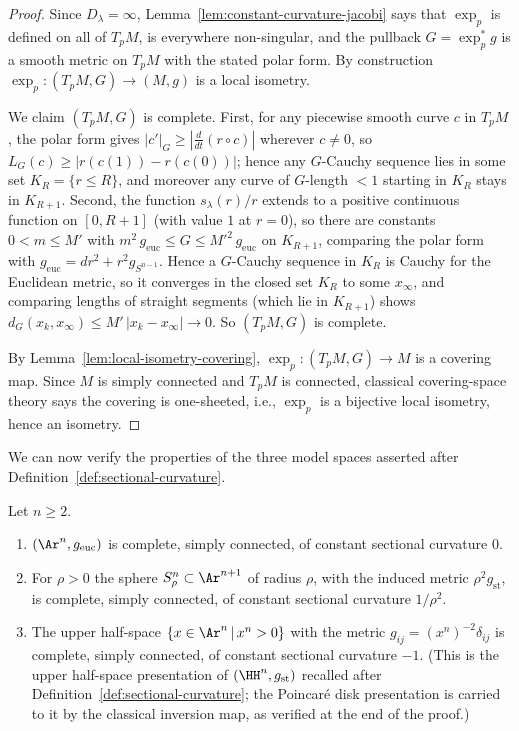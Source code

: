\begin{proof}
Since $D_\lambda=\infty$,
Lemma~\ref{lem:constant-curvature-jacobi} says that $\exp_p$ is
defined on all of $T_pM$, is everywhere non-singular, and the
pullback $G=\exp_p^*g$ is a smooth metric on $T_pM$ with the
stated polar form. By construction $\exp_p\colon (T_pM,G)\to
(M,g)$ is a local isometry.

We claim $(T_pM,G)$ is complete. First, for any piecewise smooth
curve $c$ in $T_pM$, the polar form gives
$|c'|_G\ge |\frac{d}{dt}(r\circ c)|$ wherever $c\not=0$, so
$L_G(c)\ge |r(c(1))-r(c(0))|$; hence any $G$-Cauchy sequence lies in
some set $K_R=\{r\le R\}$, and moreover any curve of $G$-length
$<1$ starting in $K_R$ stays in $K_{R+1}$. Second, the function
$s_\lambda(r)/r$ extends to a positive continuous function on
$[0,R+1]$ (with value $1$ at $r=0$), so there are constants $0<m\le
M'$ with $m^2\,g_{\mathrm{euc}}\le G\le M'^2\,g_{\mathrm{euc}}$ on
$K_{R+1}$, comparing the polar form with
$g_{\mathrm{euc}}=dr^2+r^2g_{S^{n-1}}$. Hence a $G$-Cauchy sequence
in $K_R$ is Cauchy for the Euclidean metric, so it converges in the
closed set $K_R$ to some $x_\infty$, and comparing lengths of
straight segments (which lie in $K_{R+1}$) shows
$d_G(x_k,x_\infty)\le M'\,|x_k-x_\infty|\to 0$. So $(T_pM,G)$ is
complete.

By Lemma~\ref{lem:local-isometry-covering}, $\exp_p\colon
(T_pM,G)\to M$ is a covering map. Since $M$ is simply connected and
$T_pM$ is connected, classical covering-space theory says the
covering is one-sheeted, i.e., $\exp_p$ is a bijective local
isometry, hence an isometry.
\end{proof}

We can now verify the properties of the three model spaces asserted
after Definition~\ref{def:sectional-curvature}.

\begin{lemma}
\label{lem:model-spaces}
Let $n\ge2$.
\begin{enumerate}
\item $(\Ar^n,g_{\mathrm{euc}})$ is complete, simply connected, of
constant sectional curvature $0$.
\item For $\rho>0$ the sphere $S^n_\rho\subset\Ar^{n+1}$ of radius
$\rho$, with the induced metric $\rho^2g_{\mathrm{st}}$, is
complete, simply connected, of constant sectional curvature
$1/\rho^2$.
\item The upper half-space $\{x\in\Ar^n\,|\,x^n>0\}$ with the
metric $g_{ij}=(x^n)^{-2}\delta_{ij}$ is complete, simply
connected, of constant sectional curvature $-1$. (This is the
upper half-space presentation of $(\HH^n,g_{\mathrm{st}})$
recalled after Definition~\ref{def:sectional-curvature}; the
Poincar\'e disk presentation is carried to it by the classical
inversion map, as verified at the end of the proof.)
\end{enumerate}
\end{lemma}

